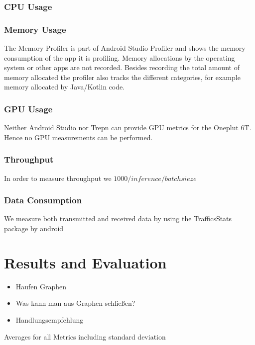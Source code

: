 \subsubsection{CPU Usage}

\subsubsection{Memory Usage}
The Memory Profiler is part of Android Studio Profiler and shows the memory consumption of the app it is profiling. Memory allocations by the operating system or other apps are not recorded. Besides recording the total amount of memory allocated the profiler also tracks the different categories, for example memory allocated by Java/Kotlin code.
\subsubsection{GPU Usage}
Neither Android Studio nor Trepn can provide GPU metrics for the Oneplut 6T. Hence no GPU measurements can be performed.
\subsubsection{Throughput}
In order to measure throughput we 
$1000/inference/batchsieze$
\subsubsection{Data Consumption}
We measure both transmitted and received data by using the TrafficsStats package by android
\section{Results and Evaluation}
\begin{itemize}
    \item Haufen Graphen
    \item Was kann man aus Graphen schließen?
    \item Handlungsempfehlung
\end{itemize}
\begin{table}


    \centering
\scalebox{0.5}{
}
\caption{Averages for all Metrics including standard deviation}

\end{table}
\endinput 
